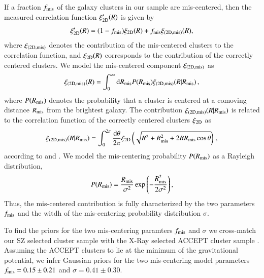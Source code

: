 \documentclass[iop, apjl, twocolappendix, numberedappendix]{emulateapj}
\begin{document}
If a fraction $f_{\rm mis}$ of the galaxy clusters in our sample are
mis-centered, then the measured correlation function $\xi'_{\rm
2D}(R)$ is given by
%
%
\begin{equation}
\xi'_{\rm 2D}(R) = (1-f_{\rm mis})\xi_{\rm 2D}(R)+f_{\rm mis}\xi_{\rm
(2D,mis)}(R)\\,
\label{eq:full}
\end{equation}
where $\xi_{\rm (2D,mis)}$ denotes the contribution of the
mis-centered clusters to the correlation function, and $\xi_{\rm
2D}(R)$ corresponds to the contribution of the correctly centered
clusters. We model the mis-centered component $\xi_{\rm (2D,mis)}$ as
\begin{equation}
\xi_{\rm (2D,mis)}(R)=\int_0^\infty \mathrm{d}R_{\rm mis} P(R_{\rm
mis})\xi_{\rm (2D,mis)}(R|R_{\rm mis})\,,
\end{equation}
where $P(R_{\rm mis})$ denotes the probability that a cluster is
centered at a comoving distance $R_{\rm mis}$ from the brightest
galaxy. The contribution $\xi_{\rm (2D,mis)}(R|R_{\rm mis})$ is
related to the correlation function of the correctly centered clusters
$\xi_{\rm 2D}$ as
\begin{equation}
\xi_{\rm (2D,mis)}(R|R_{\rm
mis})=\int_0^{2\pi}\frac{\mathrm{d}\theta}{2\pi}\xi_{\rm
2D}\left(\sqrt{R^2+R_{\rm mis}^2+2RR_{\rm mis}\cos{\theta}}\right)\,,
\end{equation}
according to \citet{yang2006weak} and \citet{johnston2007cross}. We
model the mis-centering probability $P(R_{\rm mis})$ as a Rayleigh
distribution,
\begin{equation}
P(R_{\rm mis})=\frac{R_{\rm mis}}{\sigma^2}\exp{\left( -\frac{R_{\rm
mis}^2}{2\sigma^2}\right)}\,,
\end{equation}
Thus, the mis-centered contribution is fully characterized by the
two parameters $f_{\rm mis}$ and the witdh of the mis-centering
probability distribution $\sigma$.

To find the priors for the two mis-centering paramters $f_{\rm mis}$
and $\sigma$ we cross-match our SZ selected cluster sample with the
X-Ray selected ACCEPT cluster sample \citep{cavagnolo2009vizier}.
Assuming the ACCEPT clusters to lie at the minimum of the
gravitational potential, we infer Gaussian priors for the two
mis-centering model parameters $f_{\rm mis}=0.15\pm0.21$ and
$\sigma=0.41\pm0.30$.
\end{document}
